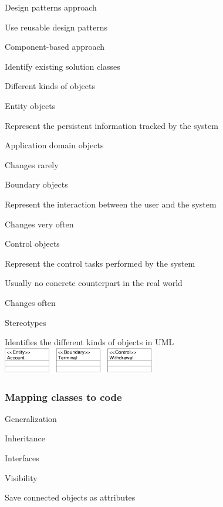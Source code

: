 \documentclass[10pt]{article}
\begin{document}
	\item Design patterns approach
	\enumstart
		\item Use reusable design patterns
	\enumend

	\item Component-based approach
	\enumstart
		\item Identify existing solution classes
	\enumend

	\item Different kinds of objects
	\enumstart
		\item Entity objects
		\enumstart
			\item Represent the persistent information tracked by the system
			\item Application domain objects
			\item Changes rarely
		\enumend
		\item Boundary objects
		\enumstart
			\item Represent the interaction between the user and the system
			\item Changes very often
		\enumend
		\item Control objects
		\enumstart
			\item Represent the control tasks performed by the system
			\item Usually no concrete counterpart in the real world
			\item Changes often
		\enumend
	\enumend
	\item Stereotypes
	\enumstart
		\item Identifies the different kinds of objects in UML
		\\ \includegraphics[width=0.5\textwidth]{stereotypes.png}
	\enumend
\enumend

\subsubsection{Mapping classes to code}
\enumstart
	\item Generalization
	\enumstart
		\item Inheritance
		\item Interfaces
	\enumend

	\item Visibility
	\enumstart
		\item Save connected objects as attributes
	\enumend
\end{document}
